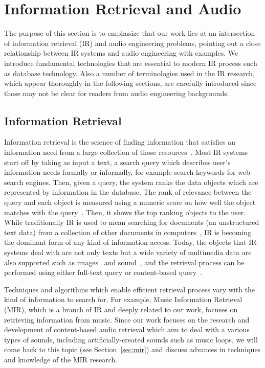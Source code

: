 \section{Information Retrieval and Audio}
The purpose of this section is to emphasize that our work lies at an intersection of information retrieval (IR) and audio engineering problems, pointing out a close relationship between IR systems and audio engineering with examples. We introduce fundamental technologies that are essential to modern IR process such as database technology. Also a number of terminologies used in the IR research, which appear thoroughly in the following sections, are carefully introduced since those may not be clear for readers from audio engineering backgrounds.

\subsection{Information Retrieval}

Information retrieval is the science of finding information that satisfies an information need from a large collection of those resources~\cite{manning2008}. Most IR systems start off by taking as input a text, a search query which describes user's information needs formally or informally, for example search keywords for web search engines. Then, given a query, the system ranks the data objects which are represented by information in the database. The rank of relevance between the query and each object is measured using a numeric score on how well the object matches with the query~\cite{guandong2010}. Then, it shows the top ranking objects to the user. While traditionally IR is used to mean searching for documents (an unstructured text data) from a collection of other documents in computers~\cite{manning2008}, IR is becoming the dominant form of any kind of information access. Today, the objects that IR systems deal with are not only texts but a wide variety of multimedia data are also supported such as images~\cite{abby2000} and sound~\cite{jonathan1999}, and the retrieval process can be performed using either full-text query or content-based query~\cite{lew2006}.

Techniques and algorithms which enable efficient retrieval process vary with the kind of information to search for. For example, Music Information Retrieval (MIR), which is a branch of IR and deeply related to our work, focuses on retrieving information from music. Since our work focuses on the research and development of content-based audio retrieval which aim to deal with a various types of sounds, including artificially-created sounds such as music loops, we will come back to this topic (see Section~\ref{sec:mir}) and discuss advances in techniques and knowledge of the MIR research. 

